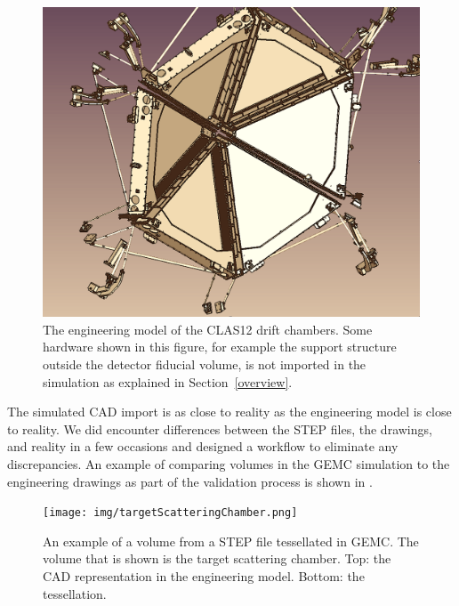 \begin{figure}[h]
	\centering
	\includegraphics[width=1.0\columnwidth,keepaspectratio]{img/cadSelection.png}
	\caption{The engineering model of the CLAS12 drift chambers. Some hardware shown in this figure, for example
          the support structure outside the detector fiducial volume, is not imported in the simulation as explained in
          Section~\ref{overview}.}
	\label{fig:cadSelection}
\end{figure}

The simulated CAD import is as close to reality as the engineering model is close to reality. We did encounter differences
between the STEP files, the drawings, and reality in a few occasions and designed a workflow to eliminate any discrepancies.
An example of comparing volumes in the GEMC simulation to the engineering drawings as part of the validation
process is shown in .

\begin{figure}
	\centering
	\texttt{[image: img/targetScatteringChamber.png]}
	\caption{An example of a volume from a STEP file tessellated in GEMC. The volume that is shown is the target
          scattering chamber. Top: the CAD representation in the engineering model. Bottom: the tessellation. }
	\label{fig:targetScatteringChamber}
\end{figure}




